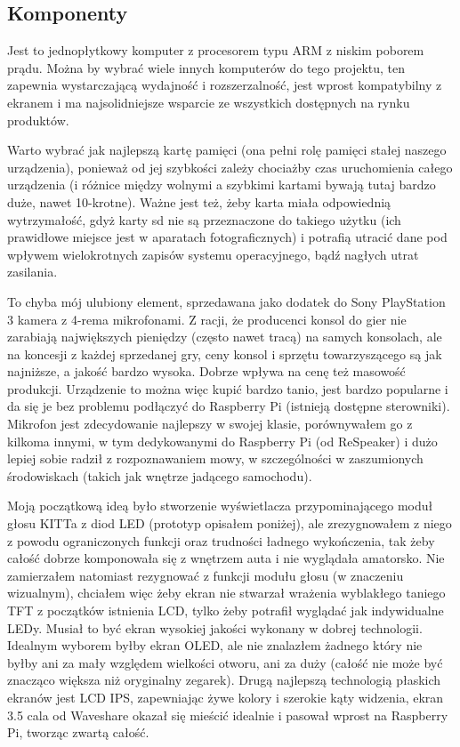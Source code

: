 \documentclass[declaration,shortabstract, inz]{iithesis}
\begin{document}
\subsection{Komponenty}
\begin{description}[style=nextline]
  \item[Raspberry Pi - model 4B w wersji 2Gb pamięci RAM]
    Jest to jednopłytkowy komputer z procesorem typu ARM z niskim poborem prądu.
    Można by wybrać wiele innych komputerów do tego projektu, ten zapewnia wystarczającą wydajność i rozszerzalność, jest wprost kompatybilny z ekranem i ma najsolidniejsze wsparcie ze wszystkich dostępnych na rynku produktów.
  \item[Karta microSD - SanDisk Extreme 32gb zgodny z UHS-1]
    Warto wybrać jak najlepszą kartę pamięci (ona pełni rolę pamięci stałej naszego urządzenia), ponieważ od jej szybkości zależy chociażby czas uruchomienia całego urządzenia (i różnice między wolnymi a szybkimi kartami bywają tutaj bardzo duże, nawet 10-krotne). Ważne jest też, żeby karta miała odpowiednią wytrzymałość, gdyż karty sd nie są przeznaczone do takiego użytku (ich prawidłowe miejsce jest w aparatach fotograficznych) i potrafią utracić dane pod wpływem wielokrotnych zapisów systemu operacyjnego, bądź nagłych utrat zasilania.
  \item[Kamera / mikrofon - Sony PlayStation Eye]
    To chyba mój ulubiony element, sprzedawana jako dodatek do Sony PlayStation 3 kamera z 4-rema mikrofonami. Z racji, że producenci konsol do gier nie zarabiają największych pieniędzy (często nawet tracą) na samych konsolach, ale na koncesji z każdej sprzedanej gry, ceny konsol i sprzętu towarzyszącego są jak najniższe, a jakość bardzo wysoka. Dobrze wpływa na cenę też masowość produkcji. Urządzenie to można więc kupić bardzo tanio, jest bardzo popularne i da się je bez problemu podłączyć do Raspberry Pi (istnieją dostępne sterowniki). Mikrofon jest zdecydowanie najlepszy w swojej klasie, porównywałem go z kilkoma innymi, w tym dedykowanymi do Raspberry Pi (od ReSpeaker) i dużo lepiej sobie radził z rozpoznawaniem mowy, w szczególności w zaszumionych środowiskach (takich jak wnętrze jadącego samochodu).
  \item[Ekran IPS 3.5'' - Waveshare 12824]
    Moją początkową ideą było stworzenie wyświetlacza przypominającego moduł głosu KITTa z diod LED (prototyp opisałem poniżej), ale zrezygnowałem z niego z powodu ograniczonych funkcji oraz trudności ładnego wykończenia, tak żeby całość dobrze komponowała się z wnętrzem auta i nie wyglądała amatorsko. Nie zamierzałem natomiast rezygnować z funkcji modułu głosu (w znaczeniu wizualnym), chciałem więc żeby ekran nie stwarzał wrażenia wyblakłego taniego TFT z początków istnienia LCD, tylko żeby potrafił wyglądać jak indywidualne LEDy. Musiał to być ekran wysokiej jakości wykonany w dobrej technologii. Idealnym wyborem byłby ekran OLED, ale nie znalazłem żadnego który nie byłby ani za mały względem wielkości otworu, ani za duży (całość nie może być znacząco większa niż oryginalny zegarek). Drugą najlepszą technologią płaskich ekranów jest LCD IPS, zapewniając żywe kolory i szerokie kąty widzenia, ekran 3.5 cala od Waveshare okazał się mieścić idealnie i pasował wprost na Raspberry Pi, tworząc zwartą całość.

\end{description}
\end{document}
